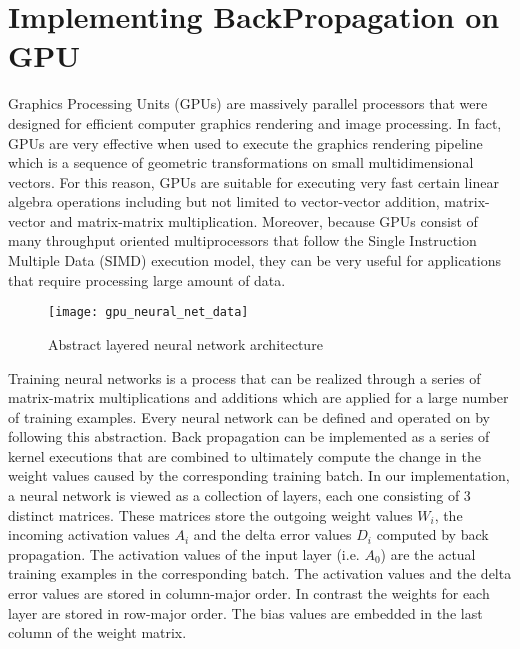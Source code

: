 \section{Implementing BackPropagation on GPU}
\label{GPUBackProp}

Graphics Processing Units (GPUs) are massively parallel processors that were designed for efficient computer graphics rendering and image processing. In fact, GPUs are very effective when used to execute the graphics rendering pipeline which is a sequence of geometric transformations on small multidimensional vectors. For this reason, GPUs are suitable for executing very fast certain linear algebra operations including but not limited to vector-vector addition, matrix-vector and matrix-matrix multiplication. Moreover, because GPUs consist of many throughput oriented multiprocessors that follow the Single Instruction Multiple Data (SIMD) execution model, they can be very useful for applications that require processing large amount of data.

\begin{figure}[ht]
\begin{center}
\centerline{\texttt{[image: gpu\_neural\_net\_data]}}
\caption{Abstract layered neural network architecture}
\label{fig:nn_architecture}
\end{center}
\vskip -0.2in
\end{figure}

Training neural networks is a process that can be realized through a series of matrix-matrix multiplications and additions which are applied for a large number of training examples. Every neural network can be defined and operated on by following this abstraction. Back propagation can be implemented as a series of kernel executions that are combined to ultimately compute the change in the weight values caused by the corresponding training batch. In our implementation, a neural network is viewed as a collection of layers, each one consisting of 3 distinct matrices. These matrices store the outgoing weight values $W_i$, the incoming activation values $A_i$ and the delta error values $D_i$ computed by back propagation. The activation values of the input layer (i.e. $A_0$) are the actual training examples in the corresponding batch. The activation values and the delta error values are stored in column-major order. In contrast the weights for each layer are stored in row-major order. The bias values are embedded in the last column of the weight matrix.

